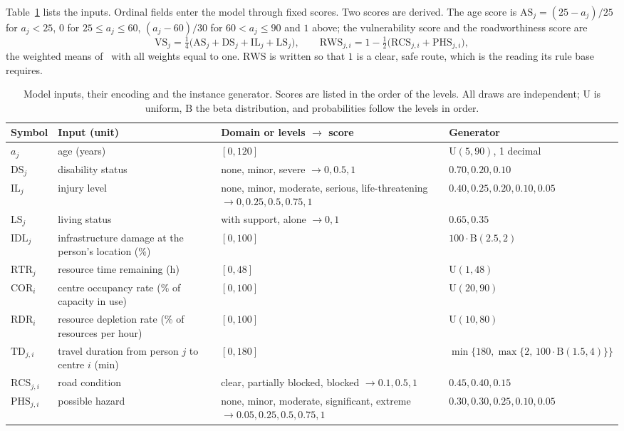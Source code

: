 \documentclass[systems,article,submit,moreauthors,pdftex]{Definitions/mdpi}
\begin{document}
Table~\ref{tab:inputs} lists the inputs. Ordinal fields enter the model through fixed scores.
Two scores are derived. The age score is $\mathrm{AS}_j=(25-a_j)/25$ for $a_j<25$, $0$ for
$25\le a_j\le 60$, $(a_j-60)/30$ for $60<a_j\le 90$ and $1$ above; the vulnerability score and
the roadworthiness score are
\begin{equation}\label{eq:vs-rws}
\mathrm{VS}_j=\tfrac14\bigl(\mathrm{AS}_j+\mathrm{DS}_j+\mathrm{IL}_j+\mathrm{LS}_j\bigr),
\qquad
\mathrm{RWS}_{j,i}=1-\tfrac12\bigl(\mathrm{RCS}_{j,i}+\mathrm{PHS}_{j,i}\bigr),
\end{equation}
the weighted means of~\cite{rabiei2026resilient} with all weights equal to one. $\mathrm{RWS}$
is written so that $1$ is a clear, safe route, which is the reading its rule base requires.

\begin{table}[H]
\centering
\caption{Model inputs, their encoding and the instance generator. Scores are listed in the
order of the levels. All draws are independent; $\mathrm{U}$ is uniform, $\mathrm{B}$ the beta
distribution, and probabilities follow the levels in order.\label{tab:inputs}}
\small
\begin{tabularx}{\textwidth}{@{}l>{\raggedright\arraybackslash}X>{\raggedright\arraybackslash}X>{\raggedright\arraybackslash}X@{}}
\toprule
Symbol & Input (unit) & Domain or levels $\to$ score & Generator\\
\midrule
$a_j$ & age (years) & $[0,120]$ & $\mathrm{U}(5,90)$, 1 decimal\\
$\mathrm{DS}_j$ & disability status & none, minor, severe $\to 0, 0.5, 1$ & $0.70, 0.20, 0.10$\\
$\mathrm{IL}_j$ & injury level & none, minor, moderate, serious, life-threatening $\to 0, 0.25, 0.5, 0.75, 1$ & $0.40, 0.25, 0.20, 0.10, 0.05$\\
$\mathrm{LS}_j$ & living status & with support, alone $\to 0, 1$ & $0.65, 0.35$\\
$\mathrm{IDL}_j$ & infrastructure damage at the person's location (\%) & $[0,100]$ & $100\cdot\mathrm{B}(2.5,2)$\\
$\mathrm{RTR}_j$ & resource time remaining (h) & $[0,48]$ & $\mathrm{U}(1,48)$\\
$\mathrm{COR}_i$ & centre occupancy rate (\% of capacity in use) & $[0,100]$ & $\mathrm{U}(20,90)$\\
$\mathrm{RDR}_i$ & resource depletion rate (\% of resources per hour) & $[0,100]$ & $\mathrm{U}(10,80)$\\
$\mathrm{TD}_{j,i}$ & travel duration from person $j$ to centre $i$ (min) & $[0,180]$ & $\min\{180,\max\{2,\,100\cdot\mathrm{B}(1.5,4)\}\}$\\
$\mathrm{RCS}_{j,i}$ & road condition & clear, partially blocked, blocked $\to 0.1, 0.5, 1$ & $0.45, 0.40, 0.15$\\
$\mathrm{PHS}_{j,i}$ & possible hazard & none, minor, moderate, significant, extreme $\to 0.05, 0.25, 0.5, 0.75, 1$ & $0.30, 0.30, 0.25, 0.10, 0.05$\\
\bottomrule
\end{tabularx}
\end{table}
\end{document}
